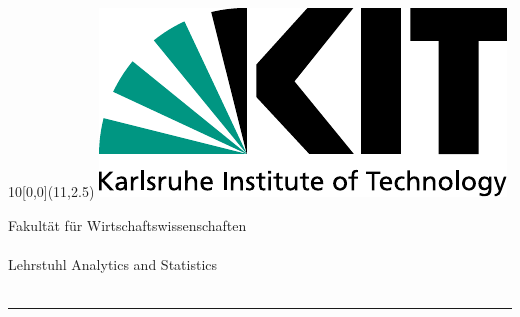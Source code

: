 
\newcommand{\diameter}{20}
\newcommand{\xone}{-15}
\newcommand{\xtwo}{160}
\newcommand{\yone}{15}
\newcommand{\ytwo}{-253}

\begin{titlepage}
	\begin{textblock}{10}[0,0](11,2.5)
		\includegraphics[width=.48\textwidth]{logos/KITLogo_EN_RGB.pdf}	\end{textblock}
	\vspace*{3.5cm}
	\begin{center}
		\Large{
			Fakultät für Wirtschaftswissenschaften\\
			\myinstitute \\
			Lehrstuhl Analytics and Statistics \\
		}
	    \vspace*{1.5cm}
		\Huge{\mytitle}\\
		\rule{0.05\textwidth}{0.5pt}\\
	    \Huge{\mytitleger}
		\vspace*{1.5cm}\\
		\Large{
			\mytype
		}\\
		\vspace*{1.5cm}
		\huge{\myname}\\
			\Large{\matricle}\\
		\vspace*{1.5cm}
	\end{center}
\Large{
\begin{center}

\end{center}}
\end{titlepage}
